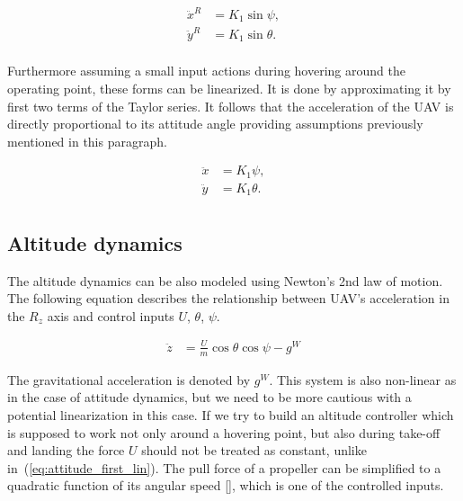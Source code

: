 \begin{equation}
\begin{split}
\ddot{x}^R &= K_1\sin \psi,\\
\ddot{y}^R &= K_1\sin \theta.\\
\end{split}
\label{eq:attitude_first_lin}
\end{equation}

Furthermore assuming a small input actions during hovering around the operating point, these forms can be linearized. It is done by approximating it by first two terms of the Taylor series. It follows that the acceleration of the UAV is directly proportional to its attitude angle providing assumptions previously mentioned in this paragraph.

\begin{equation}
\begin{split}
\ddot{x} &= K_1 \psi,\\
\ddot{y} &= K_1 \theta.\\
\end{split}
\end{equation}

\subsection{Altitude dynamics}

The altitude dynamics can be also modeled using Newton's 2nd law of motion. The following equation describes the relationship between UAV's acceleration in the $R_z$ axis and control inputs $U$, $\theta$, $\psi$.

\begin{equation}
\begin{split}
\ddot{z} &= \frac{U}{m}\cos\theta\cos\psi - g^W
\end{split}
\end{equation}

The gravitational acceleration is denoted by $g^W$. This system is also non-linear as in the case of attitude dynamics, but we need to be more cautious with a potential linearization in this case. If we try to build an altitude controller which is supposed to work not only around a hovering point, but also during take-off and landing the force $U$ should not be treated as constant, unlike in~(\ref{eq:attitude_first_lin}). The pull force of a propeller can be simplified to a quadratic function of its angular speed [], which is one of the controlled inputs.

